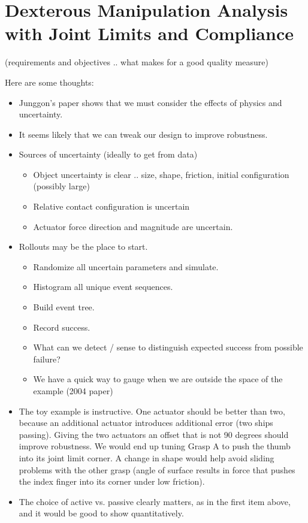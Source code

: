 \section{Dexterous Manipulation Analysis with Joint Limits and Compliance}

	(requirements and objectives .. what makes for a good quality measure)
	
	
Here are some thoughts:
\begin{itemize}
  \item Junggon's paper shows that we must consider the effects of physics and uncertainty. 
  \item It seems likely that we can tweak our design to improve robustness.
  \item Sources of uncertainty (ideally to get from data)
	\begin{itemize}
	   \item Object uncertainty is clear .. size, shape, friction, initial configuration (possibly large)
	   \item Relative contact configuration is uncertain
	   \item Actuator force direction and magnitude are uncertain.
	\end{itemize}
  \item Rollouts may be the place to start.
  	\begin{itemize}
	   \item  Randomize all uncertain parameters and simulate.
	   \item  Histogram all unique event sequences.
	   \item Build event tree.
	   \item Record success.
	   \item What can we detect / sense to distinguish expected success from possible failure?
	   \item We have a quick way to gauge when we are outside the space of the example (2004 paper)
	\end{itemize}
  \item  The toy example is instructive.   One actuator should be better than two, because an additional actuator introduces additional error (two ships passing).    Giving the two actuators an offset that is not 90 degrees should improve robustness.  We would end up tuning Grasp A to push the thumb into its joint limit corner.   A change in shape would help avoid sliding problems with the other grasp (angle of surface results in force that pushes the index finger into its corner under low friction).
  \item The choice of active vs. passive clearly matters, as in the first item above, and it would be good to show quantitatively.
\end{itemize}	
	
